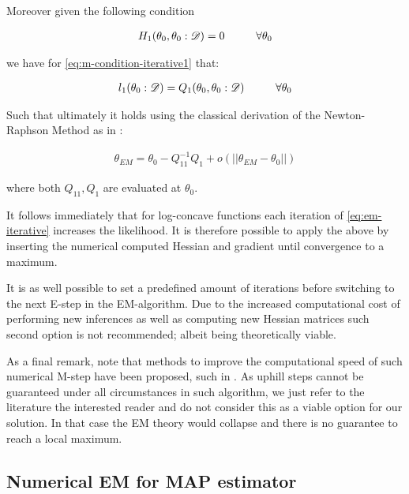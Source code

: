 \documentclass[11pt]{article}
\begin{document}
\begin{article}
Moreover given the following condition

\begin{align} 
 H_1(\theta_0, \theta_0 : \mathscr{D})  = 0 \hspace*{1cm} \forall \theta_0 \label{eq:m-condition-entropy-iterative}
\end{align}

we have for \ref{eq:m-condition-iterative1} that:

\begin{align} 
 l_1(\theta_0: \mathscr{D})  = Q_1(\theta_0, \theta_0: \mathscr{D}) \hspace*{1cm} \forall \theta_0 \label{eq:m-condition-entropy-iterative2} 
\end{align}

Such that ultimately it holds using the classical derivation of the
Newton-Raphson Method as in \cite{storvik2007numerical}:


\begin{align} 
 \theta_{EM}  = \theta_{0} - Q_{11}^{-1} Q_1 + o(||\theta_{EM} - \theta_{0}||) \label{eq:em-iterative}
\end{align}

where both \(Q_{11}, Q_{1}\) are evaluated at \(\theta_0\).

It follows immediately that for log-concave functions each iteration
of \ref{eq:em-iterative} increases the likelihood. It is therefore
possible to apply the above by inserting the numerical computed
Hessian and gradient until convergence to a maximum.

It is as well possible to set a predefined amount of iterations
before switching to the next E-step in the EM-algorithm. Due to the
increased computational cost of performing new inferences as well as
computing new Hessian matrices such second option is not
recommended; albeit being theoretically viable.

As a final remark, note that methods to improve the computational
speed of such numerical M-step have been proposed, such in
\cite{Louis_1982}. As uphill steps cannot be guaranteed under all
circumstances in such algorithm, we just refer to the literature
the interested reader and do not consider this as a viable option
for our solution. In that case the EM theory would collapse and
there is no guarantee to reach a local maximum.

\subsection{Numerical EM for MAP estimator}
\label{sec:org081a380}


\end{article}
\end{document}
